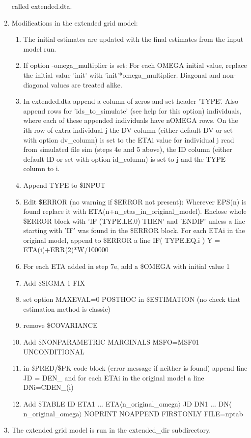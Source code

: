 \begin{enumerate}
called extended.dta. 
\item Modifications in the extended grid model:
	\begin{enumerate} 
		\item The initial estimates are updated with the final estimates from the input model run.
		\item If option -omega\_multiplier is set: For each OMEGA initial value, replace the initial value 'init' with 'init'*omega\_multiplier. 
		Diagonal and non-diagonal values are treated alike. 
		\item In extended.dta append a column of zeros and set header 'TYPE'. Also append rows for 'ids\_to\_simulate' (see help for this option) 
		individuals, where each of these appended individuals have nOMEGA rows. On the ith row of extra individual j the DV column 
		(either default DV or set with option dv\_column) is set to the ETAi value for individual j read from simulated file sim (steps 4e and 5 above),
		the ID column (either default ID or set with option id\_column) is set to j and the TYPE column to i.     
		\item Append TYPE to \$INPUT
		\item Edit \$ERROR (no warning if \$ERROR not present): Wherever EPS(n) is found replace it with ETA(n+n\_etas\_in\_original\_model). 
		Enclose whole \$ERROR block with 'IF (TYPE.LE.0) THEN' and 'ENDIF' unless a line starting with 'IF' was found in the \$ERROR block. 
		For each ETAi in the original model, append to \$ERROR a line
 IF( TYPE.EQ.i ) Y = ETA(i)+ERR(2)*W/100000
		\item For each ETA added in step 7e, add a \$OMEGA with initial value 1
		\item Add \$SIGMA 1 FIX
		\item set option MAXEVAL=0 POSTHOC in \$ESTIMATION (no check that estimation method is classic)
		\item remove \$COVARIANCE
		\item Add \$NONPARAMETRIC MARGINALS MSFO=MSF01 UNCONDITIONAL
		\item in \$PRED/\$PK code block (error message if neither is found) append line
 JD = DEN\_
and for each ETAi in the original model a line  
DNi=CDEN\_(i)
		\item Add \$TABLE ID ETA1 ... ETA$\langle$n\_original\_omega$\rangle$ JD DN1 ... DN$\langle$n\_original\_omega$\rangle$ NOPRINT 
		NOAPPEND FIRSTONLY FILE=nptab
	\end{enumerate}
\item The extended grid model is run in the extended\_dir subdirectory.

\end{enumerate}
